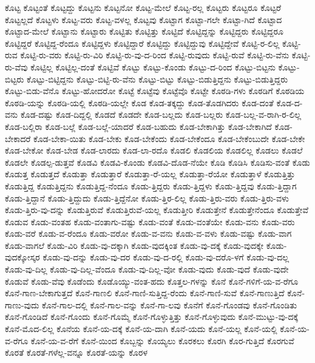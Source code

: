 {ಕೊಟ್ಟ
ಕೊಟ್ಟಂತೆ
ಕೊಟ್ಟದ್ದು
ಕೊಟ್ಟನು
ಕೊಟ್ಟನೋ
ಕೊಟ್ಟ-ಮೇಲೆ
ಕೊಟ್ಟ-ರಲ್ಲ
ಕೊಟ್ಟರು
ಕೊಟ್ಟರೂ
ಕೊಟ್ಟರೆ
ಕೊಟ್ಟಲ್ಲದೆ
ಕೊಟ್ಟಳು
ಕೊಟ್ಟ-ವರು
ಕೊಟ್ಟ-ವಳಲ್ಲ
ಕೊಟ್ಟವು
ಕೊಟ್ಟಾಗ
ಕೊಟ್ಟಾ-ಗಲೇ
ಕೊಟ್ಟಾ-ಗಿದೆ
ಕೊಟ್ಟಾದ
ಕೊಟ್ಟಾದ-ಮೇಲೆ
ಕೊಟ್ಟಾನು
ಕೊಟ್ಟಾರು
ಕೊಟ್ಟಿತು
ಕೊಟ್ಟಿತ್ತು
ಕೊಟ್ಟಿದೆ
ಕೊಟ್ಟಿದ್ದನ್ನು
ಕೊಟ್ಟಿದ್ದರು
ಕೊಟ್ಟಿದ್ದರೂ
ಕೊಟ್ಟಿದ್ದರೆ
ಕೊಟ್ಟಿದ್ದ-ರೆಂದೂ
ಕೊಟ್ಟಿದ್ದಳು
ಕೊಟ್ಟಿದ್ದಾರೆ
ಕೊಟ್ಟಿದ್ದು
ಕೊಟ್ಟಿದ್ದುವು
ಕೊಟ್ಟಿದ್ದೇವೆ
ಕೊಟ್ಟಿ-ರ-ಲಿಲ್ಲ
ಕೊಟ್ಟಿ-ರುವ
ಕೊಟ್ಟಿ-ರು-ವರು
ಕೊಟ್ಟಿ-ರು-ವಿರಿ
ಕೊಟ್ಟಿ-ರು-ವು-ದ-ರಿಂದ
ಕೊಟ್ಟಿ-ರುವುದು
ಕೊಟ್ಟಿ-ರುವೆ
ಕೊಟ್ಟಿ-ರು-ವೆನು
ಕೊಟ್ಟಿ-ರು-ವೆವು
ಕೊಟ್ಟಿಲ್ಲ
ಕೊಟ್ಟಿಲ್ಲ-ದಂತೆ
ಕೊಟ್ಟಿವೆ
ಕೊಟ್ಟು
ಕೊಟ್ಟು-ಕೊಂಡು
ಕೊಟ್ಟು-ದ-ರಿಂದ
ಕೊಟ್ಟು-ಬಿಟ್ಟನು
ಕೊಟ್ಟು-ಬಿಟ್ಟರು
ಕೊಟ್ಟು-ಬಿಟ್ಟಿದ್ದನು
ಕೊಟ್ಟು-ಬಿಟ್ಟಿ-ರು-ವೆನು
ಕೊಟ್ಟು-ಬಿಟ್ಟು
ಕೊಟ್ಟು-ಬಿಡುತ್ತಿದ್ದನು
ಕೊಟ್ಟು-ಬಿಡುತ್ತಿದ್ದರು
ಕೊಟ್ಟು-ಬಿಡು-ವೆನೊ
ಕೊಟ್ಟು-ಹೋದರೋ
ಕೊಟ್ಟೆ
ಕೊಟ್ಟೆವು
ಕೊಟ್ಟೆವೊ
ಕೊಟ್ಟೇ
ಕೊಠಡಿ-ಗಳು
ಕೊಠಡಿಗೆ
ಕೊಠಡಿಯ
ಕೊಠಡಿ-ಯನ್ನು
ಕೊಠಡಿ-ಯಲ್ಲಿ
ಕೊಠಡಿ-ಯಲ್ಲೇ
ಕೊಡ
ಕೊಡ-ತಕ್ಕದ್ದು
ಕೊಡ-ತೊಡಗಿದರು
ಕೊಡ-ದಂತೆ
ಕೊಡ-ದ-ವನು
ಕೊಡ-ದಷ್ಟು
ಕೊಡ-ದಿದ್ದಲ್ಲಿ
ಕೊಡದೆ
ಕೊಡದೇ
ಕೊಡ-ಬಲ್ಲದು
ಕೊಡ-ಬಲ್ಲರು
ಕೊಡ-ಬಲ್ಲ-ವ-ರಾಗಿ-ರ-ಲಿಲ್ಲ
ಕೊಡ-ಬಲ್ಲಿರಾ
ಕೊಡ-ಬಲ್ಲೆ
ಕೊಡ-ಬಲ್ಲೆ-ಯಾದರೆ
ಕೊಡ-ಬಹುದು
ಕೊಡ-ಬೇಕಾಗಿತ್ತು
ಕೊಡ-ಬೇಕಾಗಿದೆ
ಕೊಡ-ಬೇಕಾದರೆ
ಕೊಡ-ಬೇಕಾ-ಯಿತು
ಕೊಡ-ಬೇಕು
ಕೊಡ-ಬೇಕೆಂದು
ಕೊಡ-ಬೇಕೆಂದೂ
ಕೊಡ-ಬೇಕೆಂಬುದೇ
ಕೊಡ-ಬೇಕೇ
ಕೊಡ-ಬೇಕೋ
ಕೊಡ-ಬೇಡ
ಕೊಡ-ಲಾರದು
ಕೊಡ-ಲಾ-ರದೊ
ಕೊಡಲಿ
ಕೊಡಲಿಯ
ಕೊಡಲಿಲ್ಲ
ಕೊಡಲು
ಕೊಡಲೆ
ಕೊಡಲೇ
ಕೊಡಲ್ಪ-ಡುತ್ತವೆ
ಕೊಡವಿ
ಕೊಡವಿ-ಕೊಂಡು
ಕೊಡವಿ-ದೊಡ-ನೆಯೇ
ಕೊಡಿ
ಕೊಡಿಸಿ
ಕೊಡಿಸು-ವಂತೆ
ಕೊಡು
ಕೊಡುತ್ತ
ಕೊಡುತ್ತದೆ
ಕೊಡುತ್ತಾ
ಕೊಡುತ್ತಾರೆ
ಕೊಡುತ್ತಾ-ರೆ-ಯಲ್ಲ
ಕೊಡುತ್ತಾ-ರೆಯೋ
ಕೊಡುತ್ತಾಳೆ
ಕೊಡುತ್ತಿತ್ತು
ಕೊಡುತ್ತಿದ್ದ
ಕೊಡುತ್ತಿದ್ದನು
ಕೊಡುತ್ತಿದ್ದ-ನೆಂದೂ
ಕೊಡು-ತ್ತಿದ್ದರು
ಕೊಡು-ತ್ತಿದ್ದಳು
ಕೊಡು-ತ್ತಿದ್ದವು
ಕೊಡು-ತ್ತಿದ್ದಾಗ
ಕೊಡು-ತ್ತಿದ್ದಾನೆ
ಕೊಡು-ತ್ತಿದ್ದುದು
ಕೊಡು-ತ್ತಿದ್ದೆನೋ
ಕೊಡು-ತ್ತಿರ-ಲಿಲ್ಲ
ಕೊಡು-ತ್ತಿರು-ವರು
ಕೊಡು-ತ್ತಿರು-ವಳು
ಕೊಡು-ತ್ತಿರು-ವು-ದನ್ನು
ಕೊಡುತ್ತಿರುವೆ
ಕೊಡುತ್ತಿರುವೆ-ಯಲ್ಲ
ಕೊಡುತ್ತೀರಿ
ಕೊಡುತ್ತೇನೆ
ಕೊಡುತ್ತೇನೆಂದೂ
ಕೊಡುತ್ತೇವೆ
ಕೊಡುವ
ಕೊಡು-ವಂತಹ
ಕೊಡು-ವಂತಾಗು-ವಷ್ಟು
ಕೊಡು-ವಂತೆ
ಕೊಡು-ವಂತೆಯೇ
ಕೊಡು-ವನು
ಕೊಡು-ವರು
ಕೊಡು-ವರೆ
ಕೊಡು-ವ-ರೆಂದೂ
ಕೊಡು-ವರೋ
ಕೊಡು-ವ-ವನು
ಕೊಡು-ವ-ವಳು
ಕೊಡು-ವಷ್ಟು
ಕೊಡು-ವಾಗ
ಕೊಡು-ವಾಗಲೆ
ಕೊಡು-ವಿರಿ
ಕೊಡು-ವು-ದಕ್ಕಾಗಿ
ಕೊಡು-ವುದಕ್ಕಿಂತ
ಕೊಡು-ವು-ದಕ್ಕೆ
ಕೊಡು-ವುದಕ್ಕೇ
ಕೊಡು-ವುದಕ್ಕೋಸ್ಕರ
ಕೊಡು-ವು-ದನ್ನು
ಕೊಡು-ವು-ದರ
ಕೊಡು-ವು-ದ-ರಲ್ಲಿ
ಕೊಡು-ವು-ದರೊ-ಳಗೆ
ಕೊಡು-ವು-ದಲ್ಲ
ಕೊಡು-ವು-ದಿಲ್ಲ
ಕೊಡು-ವು-ದಿಲ್ಲ-ವೆಂದೂ
ಕೊಡು-ವು-ದಿಲ್ಲ-ವೋ
ಕೊಡು-ವುದು
ಕೊಡು-ವುದೆ
ಕೊಡು-ವುದೇ
ಕೊಡುವೆ
ಕೊಡು-ವೆವು
ಕೊಡೆಂದು
ಕೊಡೊಯ್ಯು-ವಂತ-ಹದು
ಕೊತ್ತಲ-ಗಳನ್ನು
ಕೊನೆ
ಕೊನೆ-ಗಳಿಗೆ-ಯ-ವ-ರೆಗೂ
ಕೊನೆ-ಗಾಣ-ಬೇಕಾಗುತ್ತದೆ
ಕೊನೆ-ಗಾಣಲಿ
ಕೊನೆ-ಗಾಣಿ-ಸುತ್ತಿದ್ದ-ರೆಂದು
ಕೊನೆ-ಗಾಣಿ-ಸುವೆ
ಕೊನೆ-ಗಾಣುತ್ತಿದೆ
ಕೊನೆ-ಗಾಣು-ವುದು
ಕೊನೆ-ಗಾಲ-ದಲ್ಲಿ
ಕೊನೆ-ಗಾಲ-ವನ್ನು
ಕೊನೆ-ಗಾ-ಲವು
ಕೊನೆಗೆ
ಕೊನೆ-ಗೊಂಡವು
ಕೊನೆ-ಗೊಂಡಿತು
ಕೊನೆ-ಗೊಂಡಿದೆ
ಕೊನೆ-ಗೊಂದು
ಕೊನೆ-ಗೊಮ್ಮೆ
ಕೊನೆ-ಗೊಳ್ಳುತ್ತಿತ್ತು
ಕೊನೆ-ಗೊಳ್ಳುವುದು
ಕೊನೆ-ಮುಟ್ಟು-ವು-ದಕ್ಕೆ
ಕೊನೆ-ಮೊದ-ಲಿಲ್ಲ
ಕೊನೆಯ
ಕೊನೆ-ಯ-ದಕ್ಕೆ
ಕೊನೆ-ಯ-ದಾಗಿ
ಕೊನೆ-ಯದು
ಕೊನೆ-ಯಲ್ಲ
ಕೊನೆ-ಯಲ್ಲಿ
ಕೊನೆ-ಯ-ವ-ರೆಗೂ
ಕೊನೆ-ಯ-ವ-ರೆಗೆ
ಕೊನೆ-ಯಿಂದ
ಕೊಬ್ಬನ್ನು
ಕೊಯ್ಯಲು
ಕೊರಕಲು
ಕೊರಗಿ
ಕೊರ-ಗುತ್ತಿದೆ
ಕೊರಗುವೆ
ಕೊರತೆ
ಕೊರತೆ-ಗಳೆಲ್ಲ-ವನ್ನೂ
ಕೊರತೆ-ಯನ್ನು
ಕೊರಳ
}
